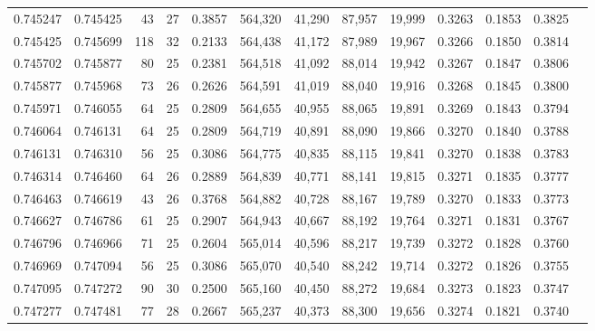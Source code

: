 \begin{tabular}{rrrrrrrrrrrrr}
0.745247 & 0.745425 &    43 &  27 &                                     0.3857 & 564,320 &  41,290 &  87,957 &  19,999 & 0.3263 & 0.1853 & 0.3825 \\
0.745425 & 0.745699 &   118 &  32 &                                     0.2133 & 564,438 &  41,172 &  87,989 &  19,967 & 0.3266 & 0.1850 & 0.3814 \\
0.745702 & 0.745877 &    80 &  25 &                                     0.2381 & 564,518 &  41,092 &  88,014 &  19,942 & 0.3267 & 0.1847 & 0.3806 \\
0.745877 & 0.745968 &    73 &  26 &                                     0.2626 & 564,591 &  41,019 &  88,040 &  19,916 & 0.3268 & 0.1845 & 0.3800 \\
0.745971 & 0.746055 &    64 &  25 &                                     0.2809 & 564,655 &  40,955 &  88,065 &  19,891 & 0.3269 & 0.1843 & 0.3794 \\
0.746064 & 0.746131 &    64 &  25 &                                     0.2809 & 564,719 &  40,891 &  88,090 &  19,866 & 0.3270 & 0.1840 & 0.3788 \\
0.746131 & 0.746310 &    56 &  25 &                                     0.3086 & 564,775 &  40,835 &  88,115 &  19,841 & 0.3270 & 0.1838 & 0.3783 \\
0.746314 & 0.746460 &    64 &  26 &                                     0.2889 & 564,839 &  40,771 &  88,141 &  19,815 & 0.3271 & 0.1835 & 0.3777 \\
0.746463 & 0.746619 &    43 &  26 &                                     0.3768 & 564,882 &  40,728 &  88,167 &  19,789 & 0.3270 & 0.1833 & 0.3773 \\
0.746627 & 0.746786 &    61 &  25 &                                     0.2907 & 564,943 &  40,667 &  88,192 &  19,764 & 0.3271 & 0.1831 & 0.3767 \\
0.746796 & 0.746966 &    71 &  25 &                                     0.2604 & 565,014 &  40,596 &  88,217 &  19,739 & 0.3272 & 0.1828 & 0.3760 \\
0.746969 & 0.747094 &    56 &  25 &                                     0.3086 & 565,070 &  40,540 &  88,242 &  19,714 & 0.3272 & 0.1826 & 0.3755 \\
0.747095 & 0.747272 &    90 &  30 &                                     0.2500 & 565,160 &  40,450 &  88,272 &  19,684 & 0.3273 & 0.1823 & 0.3747 \\
0.747277 & 0.747481 &    77 &  28 &                                     0.2667 & 565,237 &  40,373 &  88,300 &  19,656 & 0.3274 & 0.1821 & 0.3740 \\

\end{tabular}
